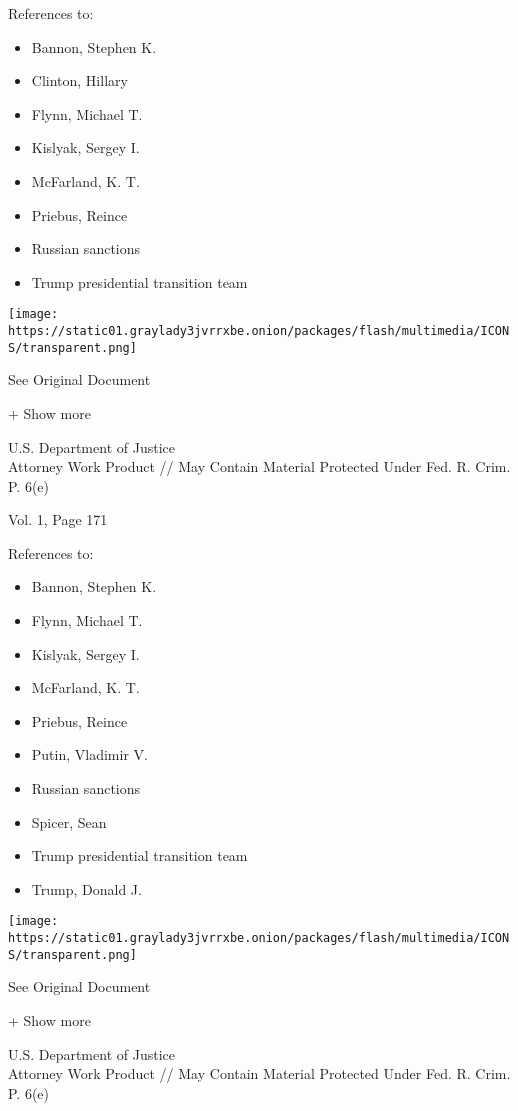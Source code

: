 References to:

\begin{itemize}
\tightlist
\item
  Bannon, Stephen K.
\item
  Clinton, Hillary
\item
  Flynn, Michael T.
\item
  Kislyak, Sergey I.
\item
  McFarland, K. T.
\item
  Priebus, Reince
\item
  Russian sanctions
\item
  Trump presidential transition team
\end{itemize}

\protect\hyperlink{}{}

\texttt{[image: https://static01.graylady3jvrrxbe.onion/packages/flash/multimedia/ICONS/transparent.png]}

See Original Document

+ Show more

U.S. Department of Justice\\
Attorney Work Product // May Contain Material Protected Under Fed. R.
Crim. P. 6(e)

Vol. 1, Page 171

References to:

\begin{itemize}
\tightlist
\item
  Bannon, Stephen K.
\item
  Flynn, Michael T.
\item
  Kislyak, Sergey I.
\item
  McFarland, K. T.
\item
  Priebus, Reince
\item
  Putin, Vladimir V.
\item
  Russian sanctions
\item
  Spicer, Sean
\item
  Trump presidential transition team
\item
  Trump, Donald J.
\end{itemize}

\protect\hyperlink{}{}

\texttt{[image: https://static01.graylady3jvrrxbe.onion/packages/flash/multimedia/ICONS/transparent.png]}

See Original Document

+ Show more

U.S. Department of Justice\\
Attorney Work Product // May Contain Material Protected Under Fed. R.
Crim. P. 6(e)

